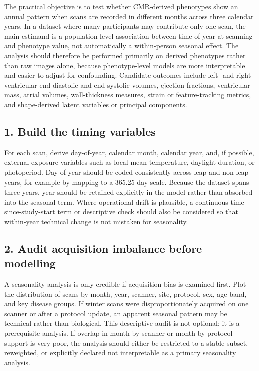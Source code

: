 The practical objective is to test whether CMR-derived phenotypes show an annual pattern when scans are recorded in different months across three calendar years. In a dataset where many participants may contribute only one scan, the main estimand is a population-level association between time of year at scanning and phenotype value, not automatically a within-person seasonal effect. The analysis should therefore be performed primarily on derived phenotypes rather than raw images alone, because phenotype-level models are more interpretable and easier to adjust for confounding. Candidate outcomes include left- and right-ventricular end-diastolic and end-systolic volumes, ejection fractions, ventricular mass, atrial volumes, wall-thickness measures, strain or feature-tracking metrics, and shape-derived latent variables or principal components.

\subsection*{1. Build the timing variables}

For each scan, derive day-of-year, calendar month, calendar year, and, if possible, external exposure variables such as local mean temperature, daylight duration, or photoperiod. Day-of-year should be coded consistently across leap and non-leap years, for example by mapping to a 365.25-day scale. Because the dataset spans three years, year should be retained explicitly in the model rather than absorbed into the seasonal term. Where operational drift is plausible, a continuous time-since-study-start term or descriptive check should also be considered so that within-year technical change is not mistaken for seasonality.

\subsection*{2. Audit acquisition imbalance before modelling}

A seasonality analysis is only credible if acquisition bias is examined first. Plot the distribution of scans by month, year, scanner, site, protocol, sex, age band, and key disease groups. If winter scans were disproportionately acquired on one scanner or after a protocol update, an apparent seasonal pattern may be technical rather than biological. This descriptive audit is not optional; it is a prerequisite analysis. If overlap in month-by-scanner or month-by-protocol support is very poor, the analysis should either be restricted to a stable subset, reweighted, or explicitly declared not interpretable as a primary seasonality analysis.

